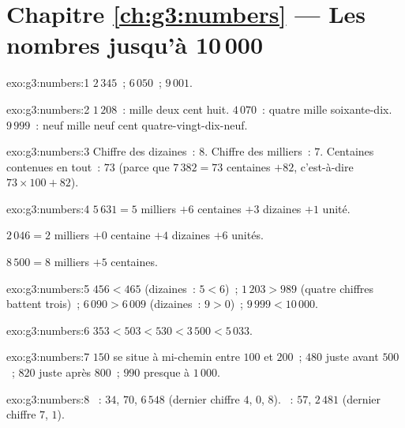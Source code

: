 \section*{Chapitre \ref{ch:g3:numbers} --- Les nombres jusqu'à 10\,000}

\begin{solution}{exo:g3:numbers:1}
$2\,345$~; \quad $6\,050$~; \quad $9\,001$.
\end{solution}

\begin{solution}{exo:g3:numbers:2}
$1\,208$~: mille deux cent huit. \quad
$4\,070$~: quatre mille soixante-dix. \quad
$9\,999$~: neuf mille neuf cent quatre-vingt-dix-neuf.
\end{solution}

\begin{solution}{exo:g3:numbers:3}
Chiffre des dizaines~: $8$. Chiffre des milliers~: $7$. Centaines
contenues en tout~: $73$ (parce que $7\,382 = 73$ centaines $+ 82$,
c'est-à-dire $73 \times 100 + 82$).
\end{solution}

\begin{solution}{exo:g3:numbers:4}
$5\,631 = 5$ milliers $+ 6$ centaines $+ 3$ dizaines $+ 1$ unité.

$2\,046 = 2$ milliers $+ 0$ centaine $+ 4$ dizaines $+ 6$ unités.

$8\,500 = 8$ milliers $+ 5$ centaines.
\end{solution}

\begin{solution}{exo:g3:numbers:5}
$456 < 465$ (dizaines~: $5 < 6$)~; \quad
$1\,203 > 989$ (quatre chiffres battent trois)~; \quad
$6\,090 > 6\,009$ (dizaines~: $9 > 0$)~; \quad
$9\,999 < 10\,000$.
\end{solution}

\begin{solution}{exo:g3:numbers:6}
$353 < 503 < 530 < 3\,500 < 5\,033$.
\end{solution}

\begin{solution}{exo:g3:numbers:7}
$150$ se situe à mi-chemin entre $100$ et $200$~; $480$ juste avant
$500$~; $820$ juste après $800$~; $990$ presque à $1\,000$.
\end{solution}

\begin{solution}{exo:g3:numbers:8}
~: $34$, $70$, $6\,548$ (dernier chiffre $4$, $0$, $8$).
~: $57$, $2\,481$ (dernier chiffre $7$, $1$).
\end{solution}

